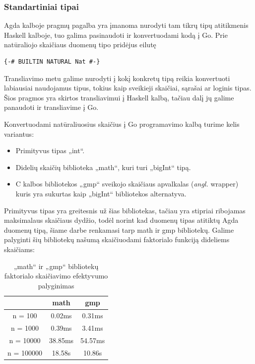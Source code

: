 \documentclass{VUMIFPSkursinis}
\begin{document}
\subsubsection{Standartiniai tipai}
Agda kalboje pragmų pagalba yra įmanoma nurodyti tam tikrų tipų atitikmenis Haskell kalboje, tuo galima pasinaudoti ir konvertuodami kodą į Go. Prie natūraliojo skaičiaus duomenų tipo pridėjus eilutę 
\begin{lstlisting}
{-# BUILTIN NATURAL Nat #-}
\end{lstlisting}
Transliavimo metu galime nurodyti į kokį konkretų tipą reikia konvertuoti labiausiai naudojamus tipus, tokius kaip sveikieji skaičiai, sąrašai ar loginis tipas. Šios pragmos yra skirtos transliavimui į Haskell kalbą, tačiau dalį jų galime panaudoti ir transliavime į Go. \par Konvertuodami natūraliuosius skaičius į Go programavimo kalbą turime kelis variantus:
\begin{itemize}
	\item Primityvus tipas „int“.
	\item Didelių skaičių biblioteka „math“, kuri turi „bigInt“ tipą.
	\item C kalbos bibliotekos „gmp“ sveikojo skaičiaus apvalkalas (\textit{angl.} wrapper) kuris yra sukurtas kaip  „bigInt“ bibliotekos alternatyva.
\end{itemize}
Primityvus tipas yra greitesnis už šias bibliotekas, tačiau yra stipriai ribojamas maksimalaus skaičiaus dydžio, todėl norint kad duomenų tipas atitiktų Agda duomenų tipą, šiame darbe renkamasi tarp math ir gmp bibliotekų. Galime palyginti šių bibliotekų našumą skaičiuodami faktorialo funkciją dideliems skaičiams:
\begin{center}
	\centering
	\begin{table}[H]
		\caption{„math“ ir „gmp“ bibliotekų faktorialo skaičiavimo efektyvumo palyginimas}
		\centering
	\begin{tabular}{ ccc } 
	\toprule
	& \textbf{math} & \textbf{gmp}  \\
	\midrule
	n = 100 & 0.02ms & 0.31ms    \\
	\midrule
	n = 1000 & 0.39ms & 3.41ms  \\
	\midrule
	n = 10000 & 38.85ms & 54.57ms  \\
	\midrule
	n = 100000 & 18.58s & 10.86s  \\
	\bottomrule
	\end{tabular}
	\centering
\end{table}
	\end{center}
\end{document}
